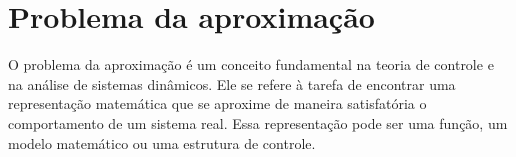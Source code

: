 
\chapter{Problema da aproximação}
\label{chap: aproximacao}

O problema da aproximação é um conceito fundamental na teoria de controle e na análise de sistemas dinâmicos. Ele se refere à tarefa de encontrar uma representação matemática que se aproxime de maneira satisfatória o comportamento de um sistema real. Essa representação pode ser uma função, um modelo matemático ou uma estrutura de controle.

